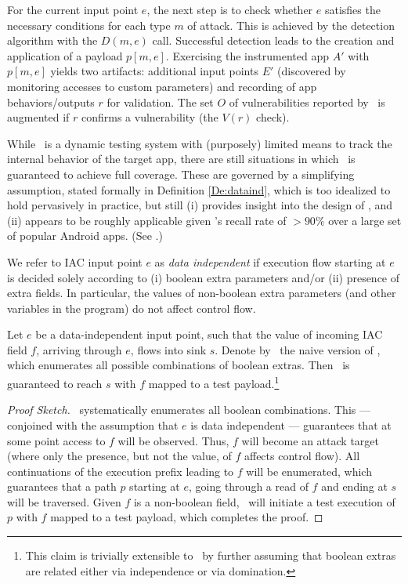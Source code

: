 For the current input point $e$, the next step is to check whether $e$ satisfies the necessary conditions for each type $m$ of attack. This is achieved by the detection algorithm with the $D(m,e)$ call. Successful detection leads to the creation and application of a payload $p[m,e]$. Exercising the instrumented app $A'$ with $p[m,e]$ yields two artifacts: additional input points $E'$ (discovered by monitoring accesses to custom parameters) and recording of app behaviors/outputs $r$ for validation. The set $O$ of vulnerabilities reported by \Tool\ is augmented if $r$ confirms a vulnerability (the $V(r)$ check).

While \Tool\ is a dynamic testing system with (purposely) limited means to track the internal behavior of the target app, there are still situations in which \Tool\ is guaranteed to achieve full coverage. These are governed by a simplifying assumption, stated formally in Definition \ref{De:dataind}, which is too idealized to hold pervasively in practice, but still (i) provides insight into the design of \Tool, and (ii) appears to be roughly applicable given \Tool's recall rate of $>90\%$ over a large set of popular Android apps. (See .)

\begin{definition}\label{De:dataind} We refer to IAC input point $e$ as \emph{data independent} if execution flow starting at $e$ is decided solely according to (i) boolean extra parameters and/or (ii) presence of extra fields. In particular, the values of non-boolean extra parameters (and other variables in the program) do not affect control flow.
\end{definition}

\begin{theorem}[Coverage] Let $e$ be a data-independent input point, such that the value of incoming IAC field $f$, arriving through $e$, flows into sink $s$. 
	Denote by \ETool\ the naive version of \Tool, which enumerates all possible combinations of boolean extras.
	Then \ETool\ is guaranteed to reach $s$ with $f$ mapped to a test payload.\footnote{
		This claim is trivially extensible to \Tool\ by further assuming that boolean extras are related either via independence or via domination.
	}
	\begin{proof}[Proof Sketch] \ETool\ systematically enumerates all boolean combinations. This --- conjoined with the assumption that $e$ is data independent --- guarantees that at some point access to $f$ will be observed. Thus, $f$ will become an attack target (where only the presence, but not the value, of $f$ affects control flow). All continuations of the execution prefix leading to $f$ will be enumerated, which guarantees that a path $p$ starting at $e$, going through a read of $f$ and ending at $s$ will be traversed. Given $f$ is a non-boolean field, \ETool\ will initiate a test execution of $p$ with $f$ mapped to a test payload, which completes the proof.
	\end{proof}
\end{theorem}